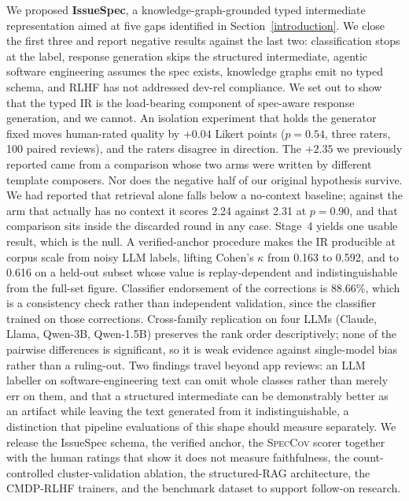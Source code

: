 \documentclass[sigconf, anonymous]{acmart}
\begin{document}
 
  We proposed \textbf{IssueSpec}, a knowledge-graph-grounded typed intermediate representation
  aimed at five gaps identified in Section~\ref{introduction}. We close the first three and
  report negative results against the last two:
  classification stops at the label, response generation skips the structured intermediate,
  agentic software engineering assumes the spec exists, knowledge graphs emit no typed schema,
  and RLHF has not addressed dev-rel compliance. We set out to show that the typed IR is the load-bearing component of spec-aware response
  generation, and we cannot. An isolation experiment that holds the generator fixed moves
  human-rated quality by $+0.04$ Likert points ($p = 0.54$, three raters, 100 paired reviews),
  and the raters disagree in direction. The $+2.35$ we previously reported came from a comparison
  whose two arms were written by different template composers. Nor does the negative half of our original hypothesis survive. We had reported that
  retrieval alone falls below a no-context baseline; against the arm that actually has no
  context it scores 2.24 against 2.31 at $p = 0.90$, and that comparison sits inside the
  discarded round in any case. Stage~4 yields one usable result, which is the null. A
  verified-anchor procedure makes the IR producible at corpus scale from noisy LLM labels,
  lifting Cohen's $\kappa$ from 0.163 to 0.592, and to 0.616 on a held-out subset whose value is
  replay-dependent and indistinguishable from the full-set figure. Classifier endorsement of the
  corrections is 88.66\%, which is a consistency check rather than independent validation, since
  the classifier trained on those corrections. Cross-family replication on four LLMs (Claude,
  Llama, Qwen-3B, Qwen-1.5B) preserves the rank order descriptively; none of the pairwise
  differences is significant, so it is weak evidence against single-model bias rather than a
  ruling-out. Two findings travel beyond app
  reviews: an LLM labeller on software-engineering text can omit whole classes rather than merely
  err on them, and that a structured intermediate can be demonstrably better as an artifact while
  leaving the text generated from it indistinguishable, a distinction that pipeline evaluations
  of this shape should measure separately. We release the IssueSpec schema, the verified anchor, the
  \textsc{SpecCov} scorer together with the human ratings that show it does not measure
  faithfulness, the count-controlled cluster-validation ablation, the
  structured-RAG architecture, the CMDP-RLHF trainers, and the benchmark dataset to support
  follow-on research.
\end{document}
